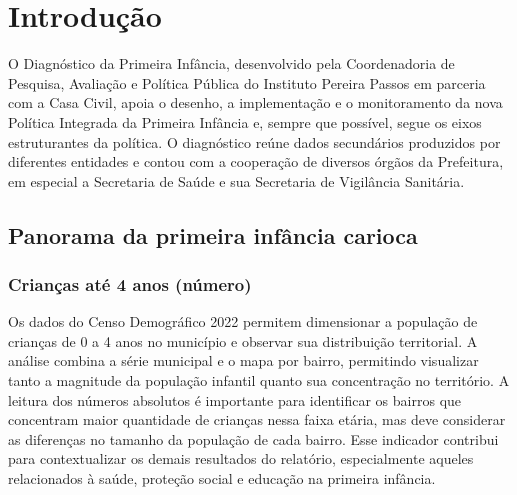 \chapter{Introdução}\label{cap:introducao}

O Diagnóstico da Primeira Infância, desenvolvido pela Coordenadoria de Pesquisa, Avaliação e Política Pública do Instituto Pereira Passos em parceria com a Casa Civil, apoia o desenho, a implementação e o monitoramento da nova Política Integrada da Primeira Infância e, sempre que possível, segue os eixos estruturantes da política. O diagnóstico reúne dados secundários produzidos por diferentes entidades e contou com a cooperação de diversos órgãos da Prefeitura, em especial a Secretaria de Saúde e sua Secretaria de Vigilância Sanitária.



\section{Panorama da primeira infância carioca}\label{sec:panorama}

\subsection{Crianças até 4 anos (número)}


Os dados do Censo Demográfico 2022 permitem dimensionar a população de crianças de 0 a 4 anos no município e observar sua distribuição territorial. A análise combina a série municipal e o mapa por bairro, permitindo visualizar tanto a magnitude da população infantil quanto sua concentração no território. A leitura dos números absolutos é importante para identificar os bairros que concentram maior quantidade de crianças nessa faixa etária, mas deve considerar as diferenças no tamanho da população de cada bairro. Esse indicador contribui para contextualizar os demais resultados do relatório, especialmente aqueles relacionados à saúde, proteção social e educação na primeira infância.


